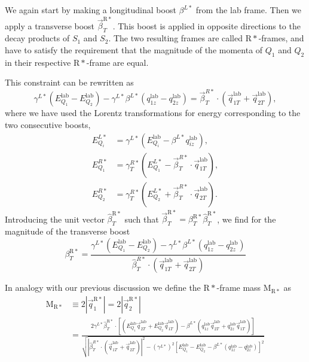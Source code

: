 
We again start by making a longitudinal boost $\beta^{L*}$ from the lab frame. Then we apply a
transverse boost $\vec{\beta}_T^{\mathrm{R}*}$. This boost is applied in opposite directions to the
decay products of $S_1$ and $S_2$. The two resulting frames are called $\mathrm{R}*$-frames, and
have to satisfy the requirement that the magnitude of the momenta of $Q_1$ and $Q_2$ in their
respective $\mathrm{R*}$-frame are equal. 

This constraint can be rewritten as
\begin{equation}
  \gamma^{L*} (E_{Q_1}^{\textrm{lab}} - E_{Q_2}^{\textrm{lab}}) - \gamma^{L*} \beta^{L*}
(q_{1z}^{\textrm{lab}} - q_{2z}^{\textrm{lab}}) = \vec{\beta}_T^{R*} \cdot
(\vec{q}_{1T}^{\textrm{lab}} + \vec{q}_{2T}^{\textrm{lab}}), 
\end{equation}
where we have used the Lorentz transformations for energy corresponding to the two consecutive
boosts,
\begin{align}
  E_{Q_i}^{L*} &= \gamma^{L*} (E_{Q_i}^{\textrm{lab}} - \beta^{L*} q_{iz}^{\textrm{lab}} ) , \\
  E_{Q_1}^{R*} &= \gamma_T^{R*} (E_{Q_1}^{L*} - \vec{\beta}_T^{R*} \cdot
\vec{q}_{1T}^{\textrm{lab}}) , \\
  E_{Q_2}^{R*} &= \gamma_T^{R*} (E_{Q_2}^{L*} + \vec{\beta}_T^{R*} \cdot
\vec{q}_{2T}^{\textrm{lab}}) .
\end{align}
Introducing the unit vector $\hat{\beta}_T^{\mathrm{R}*}$ such that $\vec{\beta}_T^{\mathrm{R}*} =
\beta_T^{\mathrm{R}*} \hat{\beta}_T^{\mathrm{R}*}$, we find for the magnitude of the transverse
boost
\begin{equation}
  \beta_T^{\mathrm{R}*} = \frac{\gamma^{L*} (E_{Q_1}^{\textrm{lab}} - E_{Q_2}^{\textrm{lab}}) -
\gamma^{L*} \beta^{L*} (q_{1z}^{\textrm{lab}} - q_{2z}^{\textrm{lab}})}{\hat{\beta}_T^{R*} \cdot
(\vec{q}_{1T}^{\textrm{lab}} + \vec{q}_{2T}^{\textrm{lab}})}
\end{equation}

In analogy with our previous discussion we define the $\mathrm{R}*$-frame mass $\mathrm{M_{R*}}$ as
\begin{align}
  \mathrm{M_{R*}} &\equiv 2 |\vec{q}_1^{\mathrm{R}*}| = 2 |\vec{q}_2^{\mathrm{R}*}| \\
                  &= \frac{2\gamma^{L*} \hat{\beta}_T^{\mathrm{R}*} \cdot \left[
(E_{Q_1}^{\textrm{lab}}\vec{q}_{2T}^{\textrm{lab}} +
E_{Q_2}^{\textrm{lab}}\vec{q}_{1T}^{\textrm{lab}}) - \beta^{L*}
(q_{1z}^{\textrm{lab}}\vec{q}_{2T}^{\textrm{lab}} +
q_{2z}^{\textrm{lab}}\vec{q}_{1T}^{\textrm{lab}}) \right]}
                           {\sqrt{|\hat{\beta}_T^{R*} \cdot (\vec{q}_{1T}^{\textrm{lab}} +
\vec{q}_{2T}^{\textrm{lab}})|^2 - (\gamma^{L*})^2 \left[ E_{Q_1}^{\textrm{lab}} -
E_{Q_2}^{\textrm{lab}} - \beta^{L*} (q_{1z}^{\textrm{lab}} - q_{2z}^{\textrm{lab}}) \right]^2}}
\end{align}

